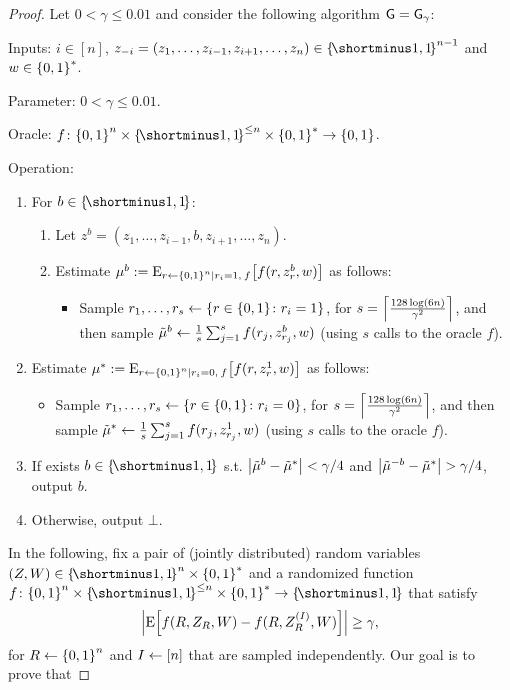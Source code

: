 {\begin{proof}
	Let $0 < \gamma \leq 0.01$ and consider the following algorithm $\mathsf{G} = \mathsf{G}_{\gamma}$:
	\begin{algorithm}
		\item Inputs: $i \in [n]$,  $z_{-i} = (z_1,\ldots,z_{i-1},z_{i+1},\ldots,z_n) \in \oo^{n-1}$ and $w \in \zo^*$.
		\item Parameter: $0 < \gamma \leq 0.01$.
		\item Oracle: $f \colon \zo^n \times \oo^{\leq n} \times \zo^* \rightarrow \zo$.
		\item Operation:~
		\begin{enumerate}
			\item For $b \in \oo$:
			\begin{enumerate}
				\item Let $z^b = (z_1,\ldots,z_{i-1},b,z_{i+1},\ldots,z_n)$.
				\item Estimate $\mu^b \eqdef \eex{r \la \zo^n \mid r_i = 1, \: f}{f(r,z^b_{r}, w)}$ as follows:
				\begin{itemize}
					\item Sample $r_1,\ldots,r_{s} \la \set{r \in \zo \colon r_i = 1}$, for $s = \ceil{\frac{128 \log (6n)}{\gamma^2}}$, and then sample $\tilde{\mu}^b \gets \frac1{s} \sum_{j=1}^s f(r_j,z^b_{r_j}, w)$ (using $s$ calls to the oracle $f$).
				\end{itemize}
			\end{enumerate}
			\item Estimate $\mu^* \eqdef \eex{r \la \zo^n \mid r_i = 0, \: f}{f(r,z^1_{r}, w)}$ as follows:
			\begin{itemize}
				\item Sample $r_1,\ldots,r_{s}  \la \set{r \in \zo \colon r_i = 0}$, for $s = \ceil{\frac{128 \log (6n)}{\gamma^2}}$, and then sample $\tilde{\mu}^* \gets \frac1{s} \sum_{j=1}^s f(r_j,z^1_{r_j}, w)$ (using $s$ calls to the oracle $f$).
			\end{itemize}
			\item If exists $b \in \oo$ s.t. $\size{\tilde{\mu}^b - \tilde{\mu}^*} < \gamma/4$ and $\size{\tilde{\mu}^{-b} - \tilde{\mu}^*} > \gamma/4$, output $b$.
			\item Otherwise, output $\bot$.
		\end{enumerate}
	\end{algorithm}
	In the following, fix a pair of (jointly distributed) random variables $(Z,W) \in \oo^n \times \zo^*$ and a randomized function  $f \colon \zo^n \times \oo^{\leq n} \times \zo^* \rightarrow \oo$ that satisfy 
	\begin{align*}
		\size{\ex{f(R,Z_{R},W) - f(R,Z^{(I)}_{R},W)}} \geq \gamma,
	\end{align*}
	for $R \la \zo^n$ and $I \gets [n]$ that are sampled independently. 
	Our goal is to prove that 
	

\end{proof}}
